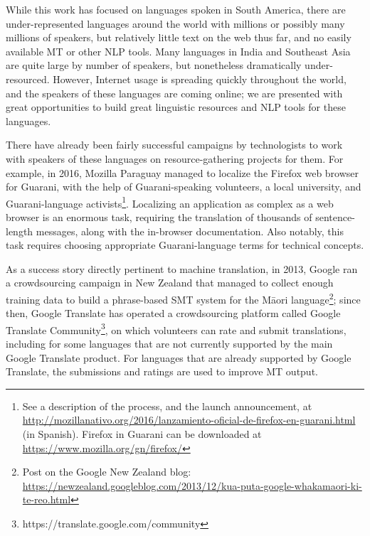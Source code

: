 While this work has focused on languages spoken in South America, there are
under-represented languages around the world with millions or possibly many
millions of speakers, but relatively little text on the web thus far, and no
easily available MT or other NLP tools. Many languages in India and Southeast
Asia are quite large by number of speakers, but nonetheless dramatically
under-resourced. However, Internet usage is spreading quickly throughout the
world, and the speakers of these languages are coming online; we are presented
with great opportunities to build great linguistic resources and NLP tools for
these languages.

There have already been fairly successful campaigns by technologists to work
with speakers of these languages on resource-gathering projects for them. For
example, in 2016, Mozilla Paraguay managed to localize the Firefox web browser
for Guarani, with the help of Guarani-speaking volunteers, a local university,
and Guarani-language activists\footnote{See a description of the process, and
the launch announcement, at
\url{http://mozillanativo.org/2016/lanzamiento-oficial-de-firefox-en-guarani.html}
(in Spanish). Firefox in Guarani can be downloaded at
\url{https://www.mozilla.org/gn/firefox/}}. Localizing an application as
complex as a web browser is an enormous task, requiring the translation of
thousands of sentence-length messages, along with the in-browser
documentation. Also notably, this task requires choosing appropriate
Guarani-language terms for technical concepts.

As a success story directly pertinent to machine translation, in 2013, Google
ran a crowdsourcing campaign in New Zealand that managed to collect
enough training data to build a phrase-based SMT system for the Māori
language\footnote{Post on the Google New Zealand blog:
\url{https://newzealand.googleblog.com/2013/12/kua-puta-google-whakamaori-ki-te-reo.html}};
since then, Google Translate has operated a crowdsourcing platform called
Google Translate Community\footnote{https://translate.google.com/community},
on which volunteers can rate and submit translations, including for some
languages that are not currently supported by the main Google Translate
product. For languages that are already supported by Google Translate, the
submissions and ratings are used to improve MT output.

